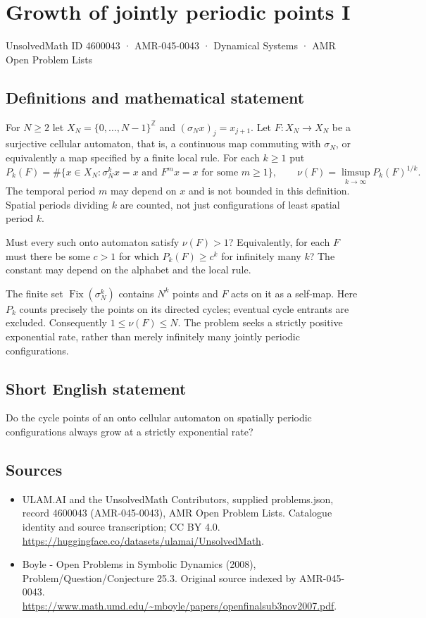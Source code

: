 \documentclass[11pt,a4paper]{article}
\begin{document}
\section*{Growth of jointly periodic points I}\label{4600043}
{\small UnsolvedMath ID 4600043 · AMR-045-0043 · Dynamical Systems · AMR Open Problem Lists}
\subsection{Definitions and mathematical statement}
For $N\ge2$ let $X_N=\{0,\ldots,N-1\}^{\mathbb Z}$ and
$(\sigma_Nx)_j=x_{j+1}$. Let $F:X_N\to X_N$ be a surjective
cellular automaton, that is, a continuous map commuting with
$\sigma_N$, or equivalently a map specified by a finite local
rule. For each $k\ge1$ put
\[
 P_k(F)=\#\{x\in X_N:\sigma_N^k x=x
                  \text{ and }F^m x=x\text{ for some }m\ge1\},
 \qquad \nu(F)=\limsup_{k\to\infty}P_k(F)^{1/k}.
\]
The temporal period $m$ may depend on $x$ and is not bounded
in this definition. Spatial periods dividing $k$ are counted,
not just configurations of least spatial period $k$.

Must every such onto automaton satisfy $\nu(F)>1$?
Equivalently, for each $F$ must there be some $c>1$ for which
$P_k(F)\ge c^k$ for infinitely many $k$? The constant may
depend on the alphabet and the local rule.

The finite set $\operatorname{Fix}(\sigma_N^k)$ contains
$N^k$ points and $F$ acts on it as a self-map. Here $P_k$
counts precisely the points on its directed cycles; eventual
cycle entrants are excluded. Consequently $1\le\nu(F)\le N$.
The problem seeks a strictly positive exponential rate, rather
than merely infinitely many jointly periodic configurations.
\subsection{Short English statement}
Do the cycle points of an onto cellular automaton on spatially periodic configurations always grow at a strictly exponential rate?
\subsection{Sources}
\begin{itemize}
\item[S1] ULAM.AI and the UnsolvedMath Contributors, supplied problems.json, record 4600043 (AMR-045-0043), AMR Open Problem Lists. Catalogue identity and source transcription; CC BY 4.0.
\url{https://huggingface.co/datasets/ulamai/UnsolvedMath}.
\item[S2] Boyle - Open Problems in Symbolic Dynamics (2008), Problem/Question/Conjecture 25.3. Original source indexed by AMR-045-0043.
\url{https://www.math.umd.edu/~mboyle/papers/openfinalsub3nov2007.pdf}.
\end{itemize}
\end{document}

